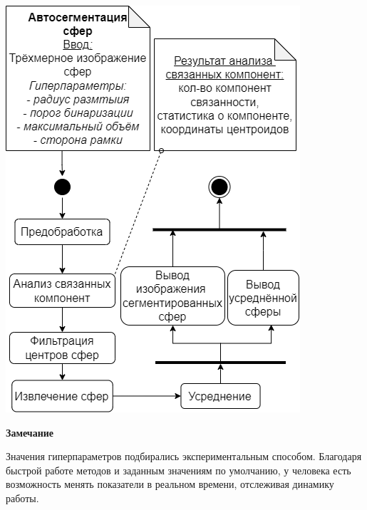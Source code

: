 \begin{minipage}{\textwidth}
	\centering
	\vspace{\mfloatsep} %
	\includegraphics[keepaspectratio=true,scale=0.47] {my_folder/images/autosegm/schema.png}
	\label{fig:autosegm-schema}  
	\vspace{\mfloatsep} %
\end{minipage}
\textbf{Замечание}
\par Значения гиперпараметров подбирались экспериментальным  способом. Благодаря быстрой работе методов и заданным значениям по умолчанию, у человека есть возможность менять показатели в реальном времени, отслеживая динамику работы.
